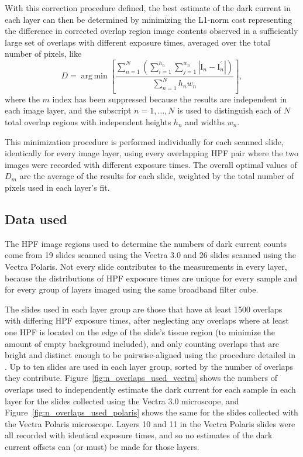 \documentclass[letterpaper,11pt]{article}
\newcommand{\reffig}[1]{Figure~\ref{#1}}
\DeclareMathOperator*{\argmin}{arg\,min}
\newcommand{\Iota}{\mathrm{I}}
\begin{document}
With this correction procedure defined, the best estimate of the dark current in each layer can then be determined by minimizing the L1-norm cost representing the difference in corrected overlap region image contents observed in a sufficiently large set of overlaps with different exposure times, averaged over the total number of pixels, like
\begin{equation}
D = \argmin{ \left[ \frac{ \sum_{n=1}^{N} \left( \sum_{i=1}^{h_{n}} \sum_{j=1}^{w_{n}} \left| \Iota_{n} - \Iota^{\prime}_{n} \right| \right) }{ \sum_{n=1}^{N} h_{n}w_{n}} \right] },
\label{eq:minimization_def}
\end{equation} 
where the $m$ index has been suppressed because the results are independent in each image layer, and the subscript $n=1,\ldots,N$ is used to distinguish each of $N$ total overlap regions with independent heights $h_{n}$ and widths $w_{n}$. 

This minimization procedure is performed individually for each scanned slide, identically for every image layer, using every overlapping HPF pair where the two images were recorded with different exposure times. The overall optimal values of $D_{m}$ are the average of the results for each slide, weighted by the total number of pixels used in each layer's fit.  

\subsection{Data used}
\label{ssec:data_used}

The HPF image regions used to determine the numbers of dark current counts come from 19 slides scanned using the Vectra 3.0 and 26 slides scanned using the Vectra Polaris. Not every slide contributes to the measurements in every layer, because the distributions of HPF exposure times are unique for every sample and for every group of layers imaged using the same broadband filter cube. 

The slides used in each layer group are those that have at least 1500 overlaps with differing HPF exposure times, after neglecting any overlaps where at least one HPF is located on the edge of the slide's tissue region (to minimize the amount of empty background included), and only counting overlaps that are bright and distinct enough to be pairwise-aligned using the procedure detailed in \cite{Heshy}. Up to ten slides are used in each layer group, sorted by the number of overlaps they contribute. \reffig{fig:n_overlaps_used_vectra} shows the numbers of overlaps used to independently estimate the dark current for each sample in each layer for the slides collected using the Vectra 3.0 microscope, and \reffig{fig:n_overlaps_used_polaris} shows the same for the slides collected with the Vectra Polaris microscope. Layers 10 and 11 in the Vectra Polaris slides were all recorded with identical exposure times, and so no estimates of the dark current offsets can (or must) be made for those layers. 
\end{document}
